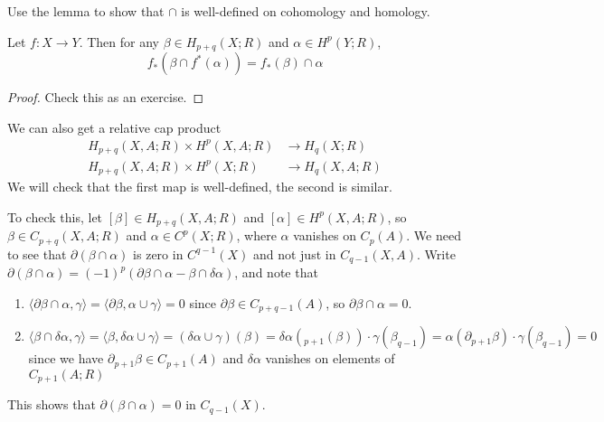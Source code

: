 \begin{exercise}
  Use the lemma to show that $\cap$ is
  well-defined on cohomology and homology.
\end{exercise}

\begin{lemma}
  Let $f : X \to Y$. Then for
  any $\beta \in H_{p + q}(X; R)$ and
  $\alpha \in H^p(Y; R)$,
  \[
    f_*(\beta \cap f^* (\alpha))
    = f_*(\beta) \cap \alpha
  \]
\end{lemma}

\begin{proof}
  Check this as an exercise.
\end{proof}

\begin{remark}
  We can also get a relative cap product
  \begin{align*}
    H_{p + q}(X, A; R) \times H^p(X, A; R)
    &\longrightarrow H_q(X; R) \\
    H_{p + q}(X, A; R) \times H^p(X; R)
    &\longrightarrow H_q(X, A; R)
  \end{align*}
  We will check that the first map is
  well-defined, the second is similar.

  To check this, let
  $[\beta] \in H_{p + q}(X, A; R)$
  and $[\alpha] \in H^p(X, A; R)$, so
  $\beta \in C_{p + q}(X, A; R)$ and
  $\alpha \in C^p(X; R)$, where
  $\alpha$ vanishes on $C_p(A)$.
  We need to see that $\partial (\beta \cap \alpha)$
  is zero in $C^{q - 1}(X)$ and not just
  in $C_{q - 1}(X, A)$.
  Write $\partial(\beta \cap \alpha) = (-1)^p (\partial \beta \cap \alpha - \beta \cap \delta \alpha)$, and note that
  \begin{enumerate}
    \item $\langle \partial \beta \cap \alpha, \gamma \rangle = \langle \partial \beta, \alpha \cup \gamma \rangle = 0$
      since $\partial \beta \in C_{p + q - 1}(A)$,
      so $\partial \beta \cap \alpha = 0$.
    \item $\langle \beta \cap \delta \alpha, \gamma \rangle = \langle \beta, \delta \alpha \cup \gamma \rangle = (\delta \alpha \cup \gamma)(\beta) = \delta \alpha({}_{p + 1}(\beta)) \cdot \gamma(\beta_{q - 1}) = \alpha(\partial_{p + 1} \beta) \cdot \gamma(\beta_{q - 1}) = 0$
      since we have
      $\partial_{p + 1} \beta \in C_{p + 1}(A)$
      and
      $\delta \alpha$ vanishes on elements
      of $C_{p + 1}(A; R)$
  \end{enumerate}
  This shows that $\partial(\beta \cap \alpha) = 0$
  in $C_{q - 1}(X)$.
\end{remark}


